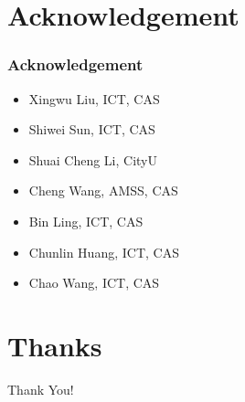 \documentclass[mathserif]{beamer}
\begin{document}
	\section{Acknowledgement}
		\begin{frame}
			\frametitle{Acknowledgement}
			\begin{itemize}
				\item Xingwu Liu, ICT, CAS
				\item Shiwei Sun, ICT, CAS
				\item Shuai Cheng Li, CityU
				\item Cheng Wang, AMSS, CAS
				\item Bin Ling, ICT, CAS
				\item Chunlin Huang, ICT, CAS
				\item Chao Wang, ICT, CAS
			\end{itemize}
		\end{frame}
	\section{Thanks}
		\begin{frame}	
			\Huge{\centerline{Thank You!}}
		\end{frame}
		
\end{document}
